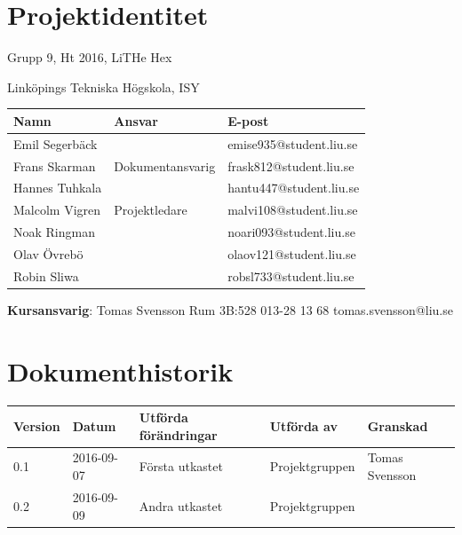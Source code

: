 \documentclass[a4paper,titlepage,12pt]{article}
\begin{document}
	\begin{center}


		\section*{Projektidentitet}
		Grupp 9, Ht 2016, LiTHe Hex

		Linköpings Tekniska Högskola, ISY

		\begin{table}[h]
			\begin{tabular}[pos]{| l | l | l |}
				\hline
				\textbf{Namn} & \textbf{Ansvar} & \textbf{E-post} \\ \hline
				Emil Segerbäck & & emise935@student.liu.se \\ \hline
				Frans Skarman & Dokumentansvarig & frask812@student.liu.se \\ \hline
				Hannes Tuhkala & & hantu447@student.liu.se \\ \hline
				Malcolm Vigren & Projektledare & malvi108@student.liu.se \\ \hline
				Noak Ringman &  & noari093@student.liu.se \\ \hline
				Olav Övrebö &  & olaov121@student.liu.se \\ \hline
				Robin Sliwa &  & robsl733@student.liu.se \\ \hline
			\end{tabular}
		\end{table}


		\textbf{Kursansvarig}: Tomas Svensson Rum 3B:528 013-28 13 68 tomas.svensson@liu.se


		
		\newpage



		\section*{Dokumenthistorik}
		\begin{table}[h]
			\begin{tabular}[pos]{| l | l | l | l | l |}
				\hline
				\textbf{Version} & \textbf{Datum} & \textbf{Utförda förändringar} 
				& \textbf{Utförda av} & \textbf{Granskad} \\ \hline

				0.1 & 2016-09-07 & Första utkastet & Projektgruppen & Tomas Svensson \\ \hline
				0.2  & 2016-09-09 & Andra utkastet & Projektgruppen & \\ \hline

			\end{tabular}
		\end{table}

	\end{center}
\end{document}
